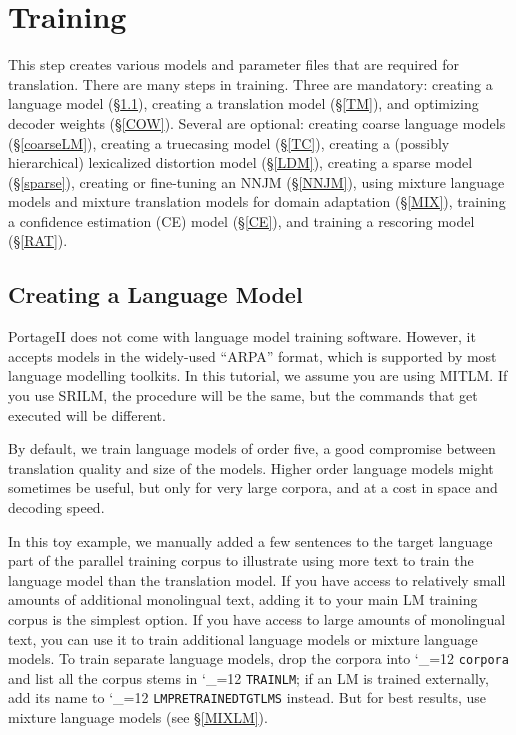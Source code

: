 \documentclass[11pt,letterpaper]{article}
\newcommand{\PS}{PortageII\xspace}
\def\code{\begingroup\catcode`\_=12 \codex}
\newcommand{\codex}[1]{\texttt{#1}\endgroup}
\begin{document}
\section{Training} \label{Training}

This step creates various models and parameter files that are required for
translation. There are many steps in training.  Three are mandatory: creating a
language model (\S\ref{LM}), creating a translation model (\S\ref{TM}), and
optimizing decoder weights (\S\ref{COW}).  Several are optional: creating coarse
language models (\S\ref{coarseLM}), creating a truecasing model (\S\ref{TC}),
creating a (possibly hierarchical) lexicalized distortion model (\S\ref{LDM}),
creating a sparse model (\S\ref{sparse}),
creating or fine-tuning an NNJM (\S\ref{NNJM}),
using mixture language models and mixture
translation models for domain adaptation (\S\ref{MIX}), training a confidence
estimation (CE) model (\S\ref{CE}), and training a rescoring model
(\S\ref{RAT}).

\subsection{Creating a Language Model} \label{LM}

\PS does not come with language model training software. However, it
accepts models in the widely-used ``ARPA'' format, which is supported by most
language modelling toolkits. In this tutorial, we assume
you are using MITLM. If you use SRILM, the procedure will be the same, but the
commands that get executed will be different.

By default, we train language models of order five, a
good compromise between translation quality and size of the models.  Higher
order language models might sometimes be useful, but only for very large
corpora, and at a cost in space and decoding speed.

In this toy example, we manually added a few sentences to the target language
part of the parallel training corpus to illustrate using more text to train the
language model than the translation model.  If you have access to relatively
small amounts of additional monolingual text, adding it to your main LM
training corpus is the simplest option.  If you have access to large amounts of
monolingual text, you can use it to train additional
language models or mixture language models.  To train separate language
models, drop the corpora into \code{corpora} and list all the corpus stems in
\code{TRAIN\us{}LM}; if an LM is trained externally, add its name to
\code{LM\us{}PRETRAINED\us{}TGT\us{}LMS} instead.  But for best results, use
mixture language models (see \S\ref{MIXLM}).
\end{document}
